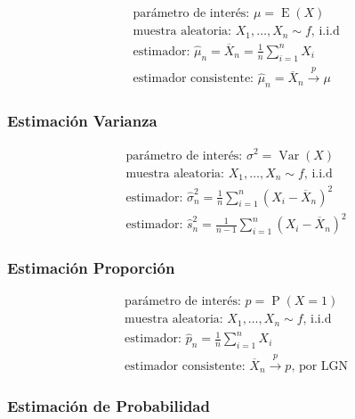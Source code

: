 \documentclass[
]{article}
\begin{document}
\[
\begin{align*}
    & \text{parámetro de interés: } \mu = \operatorname{E}(X) \\
    & \text{muestra aleatoria: } X_1, \dots, X_n \sim f \text{, i.i.d}\\
    & \text{estimador: } \hat{\mu}_n = \overline{X}_n = \frac{1}{n} \sum_{i=1}^n X_i \\
    & \text{estimador consistente: } \hat{\mu}_n = \overline{X}_{n}\xrightarrow{p} \mu
\end{align*}
\]

\hypertarget{estimaciuxf3n-varianza}{%
\subsubsection{Estimación Varianza}\label{estimaciuxf3n-varianza}}

\[
\begin{align*}
    & \text{parámetro de interés: } \sigma^2 = \operatorname{Var}(X) \\
    & \text{muestra aleatoria: } X_1, \dots, X_n \sim f \text{, i.i.d}\\
    & \text{estimador: } \hat{\sigma}^2_n = \frac{1}{n} \sum_{i=1}^n (X_i - \overline{X}_n)^2 \\
    & \text{estimador: } \hat{s}^2_n = \frac{1}{n-1} \sum_{i=1}^n (X_i - \overline{X}_n)^2
\end{align*}
\]

\hypertarget{estimaciuxf3n-proporciuxf3n}{%
\subsubsection{Estimación
Proporción}\label{estimaciuxf3n-proporciuxf3n}}

\[
\begin{align*}
    & \text{parámetro de interés: } p = \operatorname{P}(X=1) \\
    & \text{muestra aleatoria: } X_1, \dots, X_n \sim f \text{, i.i.d}\\
    & \text{estimador: } \hat{p}_n = \frac{1}{n} \sum_{i=1}^n X_i \\
    & \text{estimador consistente: } \overline{X}_{n}\xrightarrow{p} p \text{, por LGN}
\end{align*}
\]

\hypertarget{estimaciuxf3n-de-probabilidad}{%
\subsubsection{Estimación de
Probabilidad}\label{estimaciuxf3n-de-probabilidad}}
\end{document}
